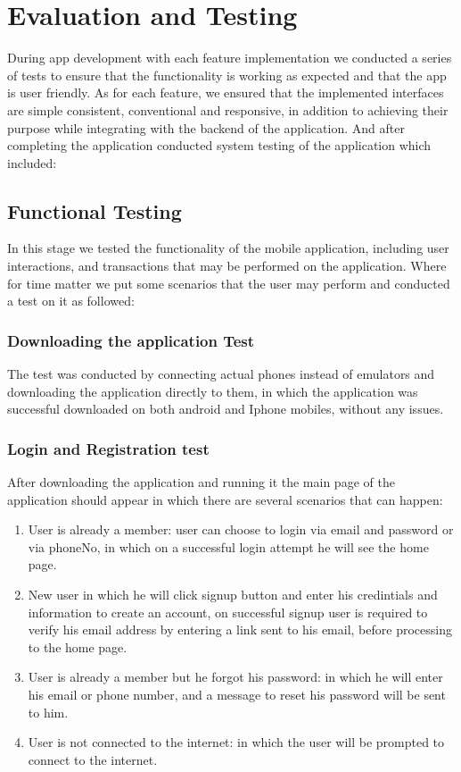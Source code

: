 \documentclass[a4paper, 12pt]{report} %
\begin{document}
    \pagebreak
    
    \section{Evaluation and Testing}
        During app development with each feature implementation we conducted a series of tests to ensure that the functionality is working as expected and that the app is user friendly. As for each feature, we ensured that the implemented interfaces are simple consistent, conventional and responsive, in addition to achieving their purpose while integrating with the backend of the application.
        And after completing the application conducted system testing of the application which included:
        \subsection{Functional Testing}
            In this stage we tested the functionality of the mobile application, including user interactions, and transactions that may be performed on the application.
            Where for time matter we put some scenarios that the user may perform and conducted a test on it as followed:
            \subsubsection{Downloading the application Test}
                The test was conducted by connecting actual phones instead of emulators and downloading the application directly to them, in which the application was successful downloaded on both android and Iphone mobiles, without any issues.
            \subsubsection{Login and Registration test}
                After downloading the application and running it the main page of the application should appear in which there are several scenarios that can happen:
                \begin{enumerate}
                    \item User is already a member: user can choose to login via email and password or via phoneNo, in which on a successful login attempt he will see the home page.
                    \item New user in which he will click signup button and enter his credintials and information to create an account, on successful signup user is required to verify his email address by entering a link sent to his email, before processing to the home page.
                    \item User is already a member but he forgot his password: in which he will enter his email or phone number, and a message to reset his password will be sent to him.
                    \item User is not connected to the internet: in which the user will be prompted to connect to the internet.
                \end{enumerate}
\end{document}
